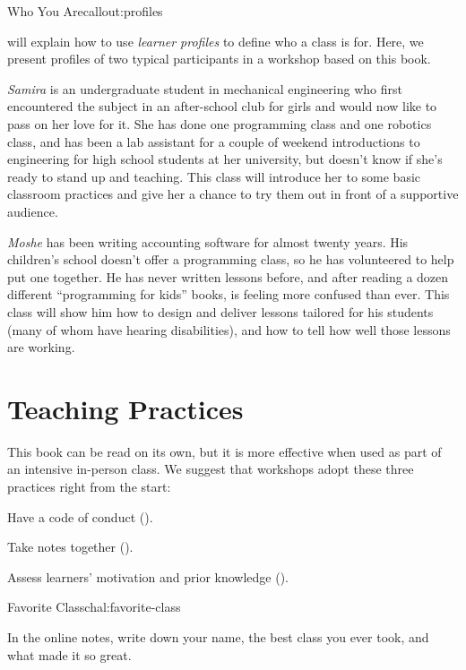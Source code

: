 \begin{callout}{Who You Are}{callout:profiles}

 will explain how to use \emph{learner
profiles} to define who a class is for.  Here, we present profiles of
two typical participants in a workshop based on this book.

\emph{Samira} is an undergraduate student in mechanical engineering
who first encountered the subject in an after-school club for girls
and would now like to pass on her love for it.  She has done one
programming class and one robotics class, and has been a lab assistant
for a couple of weekend introductions to engineering for high school
students at her university, but doesn't know if she's ready to stand
up and teaching.  This class will introduce her to some basic
classroom practices and give her a chance to try them out in front of
a supportive audience.

\emph{Moshe} has been writing accounting software for almost twenty
years.  His children's school doesn't offer a programming class, so he
has volunteered to help put one together.  He has never written
lessons before, and after reading a dozen different ``programming for
kids'' books, is feeling more confused than ever.  This class will
show him how to design and deliver lessons tailored for his students
(many of whom have hearing disabilities), and how to tell how well
those lessons are working.

\end{callout}

\section*{Teaching Practices}

This book can be read on its own, but it is more effective when used
as part of an intensive in-person class.  We suggest that workshops
adopt these three practices right from the start:

\begin{gitemize}

\item
  Have a code of conduct ().

\item
  Take notes together ().

\item
  Assess learners' motivation and prior knowledge ().

\end{gitemize}


\begin{challenge}{Favorite Class}{chal:favorite-class}

In the online notes, write down your name, the best class you ever
took, and what made it so great.

\end{challenge}
